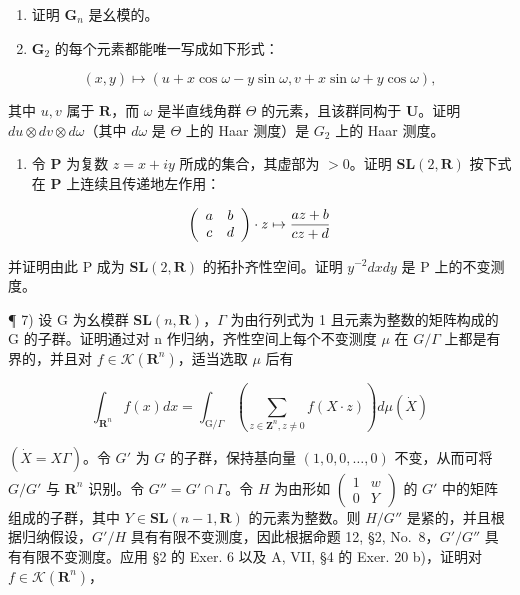 \begin{enumerate}
\def\labelenumi{\alph{enumi})}
\item
  证明 \(\mathbf{G}_n\) 是幺模的。
\item
  \(\mathbf{G}_2\) 的每个元素都能唯一写成如下形式：
\end{enumerate}

\[
(x, y) \mapsto (u + x \cos \omega - y \sin \omega , v + x \sin \omega + y \cos \omega),
\]

其中 \(u, v\) 属于 \(\mathbf{R}\)，而 \(\omega\) 是半直线角群 \(\Theta\) 的元素，且该群同构于 \(\mathbf{U}\)。证明 \(du \otimes dv \otimes d\omega\)（其中 \(d\omega\) 是 \(\Theta\) 上的 Haar 测度）是 \(G_2\) 上的 Haar 测度。

\begin{enumerate}
\def\labelenumi{\arabic{enumi})}
\setcounter{enumi}{5}
\tightlist
\item
  令 \(\mathbf{P}\) 为复数 \(z = x + iy\) 所成的集合，其虚部为 \(>0\)。证明 \(\mathbf{SL}(2,\mathbf{R})\) 按下式在 \(\mathbf{P}\) 上连续且传递地左作用：
\end{enumerate}

\[
\left( \begin{array}{c c} a & b \\ c & d \end{array} \right) \cdot z \mapsto \frac {a z + b}{c z + d}
\]

并证明由此 P 成为 \(\mathbf{SL}(2,\mathbf{R})\) 的拓扑齐性空间。证明 \(y^{-2}dx dy\) 是 P 上的不变测度。

¶ 7) 设 G 为幺模群 \(\mathbf{SL}(n,\mathbf{R})\)，\(\Gamma\) 为由行列式为 1 且元素为整数的矩阵构成的 G 的子群。证明通过对 n 作归纳，齐性空间上每个不变测度 \(\mu\) 在 \(G/\Gamma\) 上都是有界的，并且对 \(f \in \mathcal{K}(\mathbf{R}^{n})\)，适当选取 \(\mu\) 后有

\[
\int_ {\mathbf {R} ^ {n}} f (x) d x = \int_ {\mathrm{G} / \Gamma} \left(\sum_ {z \in \mathbf {Z} ^ {n}, z \neq 0} f (X \cdot z)\right) d \mu (\dot {X})\tag{1}
\]

\((\dot{X} = X\Gamma)\)。令 \(G'\) 为 \(G\) 的子群，保持基向量 \((1,0,0,\ldots,0)\) 不变，从而可将 \(G/G'\) 与 \(\mathbf{R}^n\) 识别。令 \(G'' = G' \cap \Gamma\)。令 \(H\) 为由形如 \(\begin{pmatrix} 1 & w \\ 0 & Y \end{pmatrix}\) 的 \(G'\) 中的矩阵组成的子群，其中 \(Y \in \mathbf{SL}(n-1, \mathbf{R})\) 的元素为整数。则 \(H/G''\) 是紧的，并且根据归纳假设，\(G'/H\) 具有有限不变测度，因此根据命题 12, §2, No.~8，\(G'/G''\) 具有有限不变测度。应用 §2 的 Exer. 6 以及 A, VII, §4 的 Exer. 20 b)，证明对 \(f \in \mathcal{K}(\mathbf{R}^n)\)，

